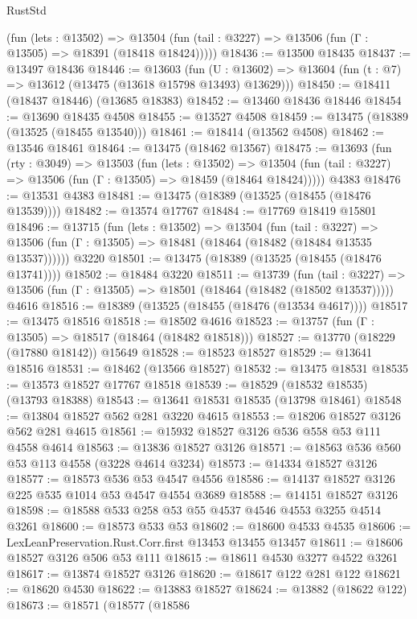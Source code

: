 \begin{lexlean}{RustStd}
\begin{coremodule}
      (fun (lets : @13502) =>
      @13504 (fun (tail : @3227) => @13506 (fun (Γ : @13505) => @18391 (@18418 @18424)))))
@18436 := @13500 @18435
@18437 := @13497 @18436
@18446 := @13603
    (fun (U : @13602) => @13604 (fun (t : @7) => @13612 (@13475 (@13618 @15798 @13493) @13629)))
@18450 := @18411 (@18437 @18446) (@13685 @18383)
@18452 := @13460 @18436 @18446
@18454 := @13690 @18435 @4508
@18455 := @13527 @4508
@18459 := @13475 (@18389 (@13525 (@18455 @13540)))
@18461 := @18414 (@13562 @4508)
@18462 := @13546 @18461
@18464 := @13475 (@18462 @13567)
@18475 := @13693
    (fun (rty : @3049) =>
    @13503
      (fun (lets : @13502) =>
      @13504 (fun (tail : @3227) => @13506 (fun (Γ : @13505) => @18459 (@18464 @18424)))))
    @4383
@18476 := @13531 @4383
@18481 := @13475 (@18389 (@13525 (@18455 (@18476 @13539))))
@18482 := @13574 @17767
@18484 := @17769 @18419 @15801
@18496 := @13715
    (fun (lets : @13502) =>
    @13504
      (fun (tail : @3227) =>
      @13506 (fun (Γ : @13505) => @18481 (@18464 (@18482 (@18484 @13535 @13537))))))
    @3220
@18501 := @13475 (@18389 (@13525 (@18455 (@18476 @13741))))
@18502 := @18484 @3220
@18511 := @13739
    (fun (tail : @3227) => @13506 (fun (Γ : @13505) => @18501 (@18464 (@18482 (@18502 @13537)))))
    @4616
@18516 := @18389 (@13525 (@18455 (@18476 (@13534 @4617))))
@18517 := @13475 @18516
@18518 := @18502 @4616
@18523 := @13757 (fun (Γ : @13505) => @18517 (@18464 (@18482 @18518)))
@18527 := @13770 (@18229 (@17880 @18142)) @15649
@18528 := @18523 @18527
@18529 := @13641 @18516
@18531 := @18462 (@13566 @18527)
@18532 := @13475 @18531
@18535 := @13573 @18527 @17767 @18518
@18539 := @18529 (@18532 @18535) (@13793 @18388)
@18543 := @13641 @18531 @18535 (@13798 @18461)
@18548 := @13804 @18527 @562 @281 @3220 @4615
@18553 := @18206 @18527 @3126 @562 @281 @4615
@18561 := @15932 @18527 @3126 @536 @558 @53 @111 @4558 @4614
@18563 := @13836 @18527 @3126
@18571 := @18563 @536 @560 @53 @113 @4558 (@3228 @4614 @3234)
@18573 := @14334 @18527 @3126
@18577 := @18573 @536 @53 @4547 @4556
@18586 := @14137 @18527 @3126 @225 @535 @1014 @53 @4547 @4554 @3689
@18588 := @14151 @18527 @3126
@18598 := @18588 @533 @258 @53 @55 @4537 @4546 @4553 @3255 @4514 @3261
@18600 := @18573 @533 @53
@18602 := @18600 @4533 @4535
@18606 := LexLeanPreservation.Rust.Corr.first @13453 @13455 @13457
@18611 := @18606 @18527 @3126 @506 @53 @111
@18615 := @18611 @4530 @3277 @4522 @3261
@18617 := @13874 @18527 @3126
@18620 := @18617 @122 @281 @122
@18621 := @18620 @4530
@18622 := @13883 @18527
@18624 := @13882 (@18622 @122)
@18673 := @18571
    (@18577
      (@18586

\end{coremodule}
\end{lexlean}
